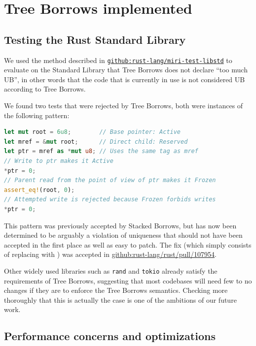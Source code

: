 \documentclass[a4paper,11pt]{article}
\theoremstyle{plain}
\theoremstyle{definition}
\theoremstyle{remark}
\newcommand{\tcode}[1]{\rstinline{#1}}
\begin{document}
\section{Tree Borrows implemented}

\subsection{Testing the Rust Standard Library}
\label{sec:testing_stdlib}

We used the method described in
\href{https://github.com/rust-lang/miri-test-libstd}{\texttt{github:rust-lang/miri-test-libstd}}
to evaluate on the Standard Library that Tree Borrows does not declare ``too much UB'',
in other words that the code that is currently in use is not considered UB according
to Tree Borrows.

We found two tests that were rejected by Tree Borrows, both were instances of the
following pattern:
\begin{lstlisting}[language=rust]
let mut root = 6u8;        // Base pointer: Active
let mref = &mut root;      // Direct child: Reserved
let ptr = mref as *mut u8; // Uses the same tag as mref
// Write to ptr makes it Active
*ptr = 0;
// Parent read from the point of view of ptr makes it Frozen
assert_eq!(root, 0);
// Attempted write is rejected because Frozen forbids writes
*ptr = 0;
\end{lstlisting}

This pattern was previously accepted by Stacked Borrows, but has now been determined
to be arguably a violation of uniqueness that should not have been accepted in the
first place as well as easy to patch. The fix (which simply consists of
replacing \tcode{\&mut root as *mut _} with \tcode{addr\_of\_mut!(root)}) was accepted
in \href{https://github.com/rust-lang/rust/pull/107954}{github:rust-lang/rust/pull/107954}.


Other widely used libraries such as \texttt{rand} and \texttt{tokio} already
satisfy the requirements of Tree Borrows, suggesting that most codebases will
need few to no changes if they are to enforce the Tree Borrows semantics.
Checking more thoroughly that this is actually the case is one of the ambitions of our future
work.

\subsection{Performance concerns and optimizations}
\label{sec:perf}
\end{document}

